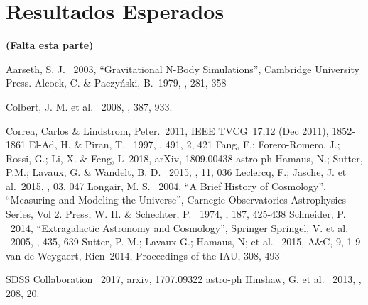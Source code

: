 \documentclass[preprint]{aastex62}
\begin{document}
  
  \section{Resultados Esperados}

{\bf (Falta esta parte)}  
    
  \nocite{*}

  \begin{thebibliography}{}
     Aarseth, S. J. \ 2003, ``Gravitational N-Body Simulations'', Cambridge University Press.
     Alcock, C. \& Paczy\'nski, B.\ 1979, \nat, 281, 358    

       Colbert, J. M. et al. \ 2008, \mnras, 387, 933.
      
     Correa, Carlos \& Lindstrom, Peter.\ 2011,  IEEE TVCG\ 17,12 (Dec 2011), 1852-1861
     El-Ad, H. \& Piran, T. \ 1997, \apj, 491, 2, 421
     Fang, F.; Forero-Romero, J.; Rossi, G.; Li, X. \& Feng, L\ 2018, arXiv, 1809.00438 astro-ph
     Hamaus, N.; Sutter, P.M.; Lavaux, G. \& Wandelt, B. D. \ 2015, \jcap, 11, 036    
     Leclercq, F.; Jasche, J. et al.\ 2015, \jcap, 03, 047
     Longair, M. S. \ 2004, ``A Brief History of Cosmology'', ``Measuring and Modeling the Universe'', Carnegie Observatories Astrophysics Series, Vol 2.
     Press, W. H. \& Schechter, P. \ 1974, \apj, 187, 425-438
     Schneider, P. \ 2014, ``Extragalactic Astronomy and Cosmology'', Springer
     Springel, V. et al. \ 2005, \nat, 435, 639
     Sutter, P. M.; Lavaux G.; Hamaus, N; et al. \ 2015, A\&C, 9, 1-9
     van de Weygaert, Rien\ 2014, Proceedings of the IAU, 308, 493      

     SDSS Collaboration \ 2017, arxiv, 1707.09322 astro-ph
     Hinshaw, G. et al. \ 2013, \apjs, 208, 20.
  \end{thebibliography}                                                           
                       

\end{document}

